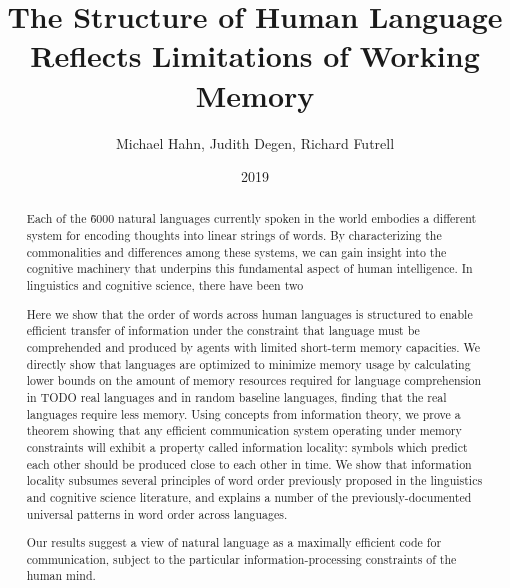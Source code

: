 \documentclass[11pt,letterpaper]{article}
\title{The Structure of Human Language Reflects Limitations of Working Memory}
\author{Michael Hahn, Judith Degen, Richard Futrell}
\date{2019}
\newcounter{theorem}
\begin{document}
\maketitle

\begin{abstract}
  Each of the \~6000 natural languages currently spoken in the world embodies a different system for encoding thoughts into linear strings of words.
  By characterizing the commonalities and differences among these systems, we can gain insight into the cognitive machinery that underpins this fundamental aspect of human intelligence. 
  In linguistics and cognitive science, there have been two 

  Here we show that the order of words across human languages is structured to enable efficient transfer of information under the constraint that language must be comprehended and produced by agents with limited short-term memory capacities.
  We directly show that languages are optimized to minimize memory usage by calculating lower bounds on the amount of memory resources required for language comprehension in TODO real languages and in random baseline languages, finding that the real languages require less memory.
  Using concepts from information theory, we prove a theorem showing that any efficient communication system operating under memory constraints will exhibit a property called information locality: symbols which predict each other should be produced close to each other in time.
  We show that information locality subsumes several principles of word order previously proposed in the linguistics and cognitive science literature, and explains a number of the previously-documented universal patterns in word order across languages.    
  
  Our results suggest a view of natural language as a maximally efficient code for communication, subject to the particular information-processing constraints of the human mind. 
\end{abstract}
\end{document}
